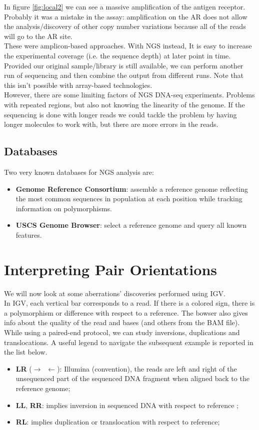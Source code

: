 In figure \ref{fig:local2} we can see a massive amplification of the antigen receptor. Probably it was a mistake in the assay: amplification on the AR does not allow the analysis/discovery of other copy number variations because all of the reads will go to the AR site. \\
These were amplicon-based approaches. 
With NGS instead, It is easy to increase the experimental coverage (i.e. the sequence depth) at later point in time. 
Provided our original sample/library is still available, we can perform another run of sequencing and then combine the output from different runs. 
Note that this isn’t possible with array-based technologies.\\
However, there are some limiting factors of NGS DNA-seq experiments. 
Problems with repeated regions, but also not knowing the linearity of the genome. 
If the sequencing is done with longer reads we could tackle the problem by having longer molecules to work with, but there are more errors in the reads. 

\subsection{Databases}
Two very known databases for NGS analysis are:
\begin{itemize}
\item \textbf{Genome Reference Consortium}: assemble a reference genome reflecting the most common sequences in population at each position while tracking information on polymorphisms. 
\item \textbf{USCS Genome Browser}: select a reference genome and query all known features.
\end{itemize}

\section{Interpreting Pair Orientations}
We will now look at some aberrations' discoveries performed using IGV.\\
In IGV, each vertical bar corresponds to a read. 
If there is a colored sign, there is a polymorphism or difference with respect to a reference. 
The bowser also gives info about the quality of the read and bases (and others from the BAM file).\\
While using a paired-end protocol, we can study inversions, duplications and translocations. A useful legend to navigate the subsequent example is reported in the list below.
\begin{itemize}
\item \textbf{LR} ($\rightarrow \, \, \, \leftarrow$): Illumina (convention), the reads are left and right of the unsequenced part of the sequenced DNA fragment when aligned back to the reference genome;
\item \textbf{LL}, \textbf{RR}: implies inversion in sequenced DNA with respect to reference ;
\item \textbf{RL}: implies duplication or translocation with respect to reference;

\end{itemize}

